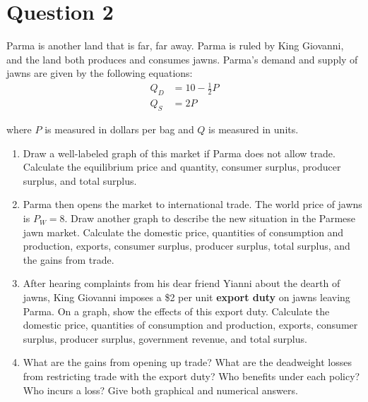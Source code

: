 \documentclass[12pt]{article}
\begin{document}
\section*{Question 2}

Parma is another land that is far, far away. Parma is ruled by King Giovanni, and the land both produces and consumes jawns. Parma's demand and supply of jawns are given by the following equations:
\begin{align*}
    Q_D &= 10 - \frac 1 2 P \\
    Q_S &= 2P
\end{align*}

where $P$ is measured in dollars per bag and $Q$ is measured in units.

\begin{enumerate}[label=(\alph*)]

\item Draw a well-labeled graph of this market if Parma does not allow trade. 
Calculate the equilibrium price and quantity, consumer surplus, producer surplus, 
and total surplus.

\item Parma then opens the market to international trade. The world price of jawns 
is $P_W = 8$. Draw another graph to describe the new situation in the Parmese 
jawn market. Calculate the domestic price, quantities of consumption and 
production, exports, consumer surplus, producer surplus, total surplus, 
and the gains from trade.

\item After hearing complaints from his dear friend Yianni about the dearth of jawns,
King Giovanni imposes a \$2 per unit \textbf{export duty} on jawns leaving Parma. 
On a graph, show the effects of this export duty. Calculate the domestic price, 
quantities of consumption and production, exports, consumer surplus, 
producer surplus, government revenue, and total surplus.

\item What are the gains from opening up trade? What are the deadweight losses 
from restricting trade with the export duty? Who benefits under each policy? 
Who incurs a loss? Give both graphical and numerical answers.

\end{enumerate}
\end{document}
